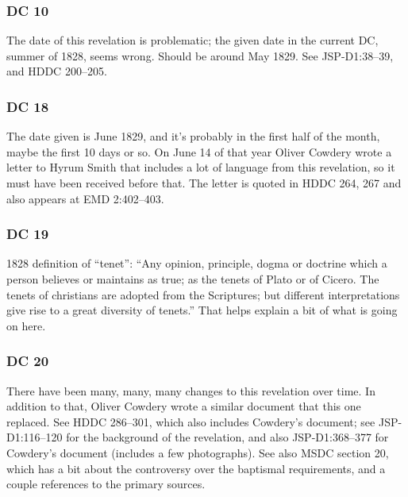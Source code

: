 	\subsubsection{DC 10} %
	
		The date of this revelation is problematic; the given date in the current DC, summer of 1828, seems wrong. Should be around May 1829. See JSP-D1:38--39, and HDDC 200--205.
		
	\subsubsection{DC 18} %
	
		The date given is June 1829, and it's probably in the first half of the month, maybe the first 10 days or so. On June 14 of that year Oliver Cowdery wrote a letter to Hyrum Smith that includes a lot of language from this revelation, so it must have been received before that. The letter is quoted in HDDC 264, 267 and also appears at EMD 2:402--403.
		
	\subsubsection{DC 19} %
	
		\begin{compactdesc}
		
		\item[31$\vert$]
		\begin{compactdesc}
		\item[And of tenets thou shalt not talk] 1828 definition of ``tenet'': ``Any opinion, principle, dogma or doctrine which a person believes or maintains as true; as the tenets of Plato or of Cicero. The tenets of christians are adopted from the Scriptures; but different interpretations give rise to a great diversity of tenets.''
			That helps explain a bit of what is going on here.
		\end{compactdesc}
		
		\end{compactdesc}
		
	\subsubsection{DC 20} %
	
		There have been many, many, many changes to this revelation over time. In addition to that, Oliver Cowdery wrote a similar document that this one replaced. See HDDC 286--301, which also includes Cowdery's document; see JSP-D1:116--120 for the background of the revelation, and also JSP-D1:368--377 for Cowdery's document (includes a few photographs).
		See also MSDC section 20, which has a bit about the controversy over the baptismal requirements, and a couple references to the primary sources.
	

